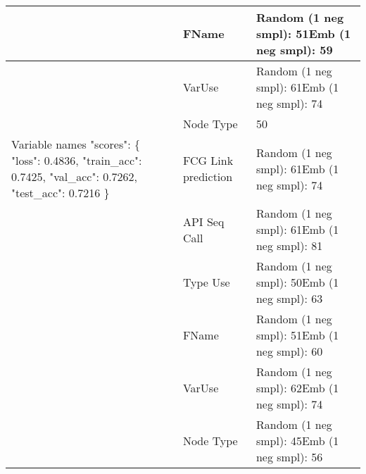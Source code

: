 \documentclass[a4paper,twoside]{article}
\begin{document}
\begin{table*}
\begin{tabular}{|p{4cm}|p{5cm}|p{5cm}|}
         & FName & Random (1 neg smpl): 51Emb (1 neg smpl): 59 \\ \hline
         & VarUse & Random (1 neg smpl): 61Emb (1 neg smpl): 74 \\ \hline
         & Node Type & 50 \\ \hline
        Variable names "scores": \{    "loss": 0.4836,    "train\_acc": 0.7425,    "val\_acc": 0.7262,    "test\_acc": 0.7216  \} & FCG Link prediction & Random (1 neg smpl): 61Emb (1 neg smpl): 74 \\ \hline
         & API Seq Call & Random (1 neg smpl): 61Emb (1 neg smpl): 81 \\ \hline
         & Type Use & Random (1 neg smpl): 50Emb (1 neg smpl): 63 \\ \hline
         & FName & Random (1 neg smpl): 51Emb (1 neg smpl): 60 \\ \hline
         & VarUse & Random (1 neg smpl): 62Emb (1 neg smpl): 74 \\ \hline
         & Node Type & Random (1 neg smpl): 45Emb (1 neg smpl): 56 \\ \hline
    \end{tabular}
\end{table*}



\end{document}
